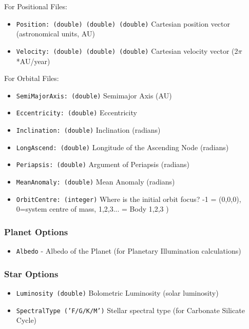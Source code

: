 \documentclass[usenatbib,11pt]{article}
\begin{document}
For Positional Files:

\begin{itemize}

\item{\texttt{Position: (double) (double) (double)}} Cartesian position vector (astronomical units, AU)
\item{\texttt{Velocity: (double) (double) (double)}} Cartesian velocity vector (2$\pi$ *AU/year)
\end{itemize}


For Orbital Files:

\begin{itemize}
\item{\texttt{SemiMajorAxis: (double)}} Semimajor Axis (AU)
\item{\texttt{Eccentricity: (double)}} Eccentricity
\item{\texttt{Inclination: (double)}} Inclination (radians)
\item{\texttt{LongAscend: (double)}} Longitude of the Ascending Node (radians)
\item{\texttt{Periapsis: (double)}} Argument of Periapsis (radians)
\item{\texttt{MeanAnomaly: (double)}} Mean Anomaly (radians)
\item{\texttt{OrbitCentre: (integer)}} Where is the initial orbit focus? -1 = (0,0,0), 0=system centre of mass, 1,2,3... = Body 1,2,3 )
\end{itemize}


\subsubsection{Planet Options}
\begin{itemize}
\item \texttt{Albedo} - Albedo of the Planet (for Planetary Illumination calculations)
\end{itemize}

\subsubsection{Star Options}

\begin{itemize}
\item{\texttt{Luminosity (double)}} Bolometric Luminosity (solar luminosity)
\item{\texttt{SpectralType ('F/G/K/M')}} Stellar spectral type (for Carbonate Silicate Cycle)
\end{itemize}
\end{document}
